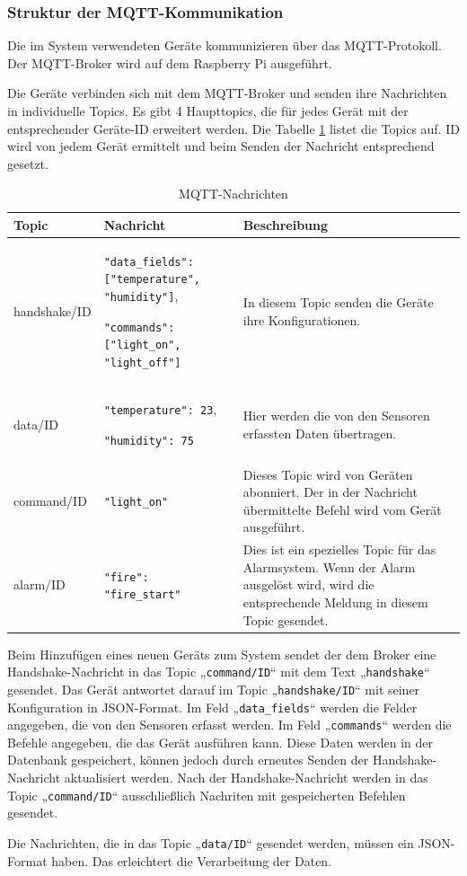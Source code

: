 \documentclass[12pt, letterpaper]{article}
\begin{document}
\subsubsection{Struktur der MQTT-Kommunikation}
\par Die im System verwendeten Geräte kommunizieren über das MQTT-Protokoll. Der MQTT-Broker wird auf dem Raspberry Pi ausgeführt. 
\par Die Geräte verbinden sich mit dem MQTT-Broker und senden ihre Nachrichten in individuelle Topics. Es gibt 4 Haupttopics, die für jedes Gerät mit der entsprechender Geräte-ID erweitert werden. Die Tabelle \ref{tab:mqttnachrichten} listet die Topics auf. ID wird von jedem Gerät ermittelt und beim Senden der Nachricht entsprechend gesetzt.
\begin{table}[h]
  \centering
  \begin{tabular}{|>{\centering\arraybackslash}m{}|>{\centering\arraybackslash}m{6cm}|>{\centering\arraybackslash}m{8cm}|}
    \hline
    \textbf{Topic}      & \textbf{Nachricht}                         & \textbf{Beschreibung} \\ \hline
    handshake/ID   &  \texttt{"data\_fields": ["temperature", "humidity"]},\par \texttt{"commands": ["light\_on", "light\_off"]}                                   &   In diesem Topic senden die Geräte ihre Konfigurationen.\\\hline
    data/ID     & \texttt{"temperature": 23}, \par \texttt{"humidity": 75} & Hier werden die von den Sensoren erfassten Daten übertragen. \\ \hline
    command/ID  & \texttt{"light\_on"}  & Dieses Topic wird von Geräten abonniert. Der in der Nachricht übermittelte Befehl wird vom Gerät ausgeführt. \\ \hline
    alarm/ID    & \texttt{"fire": "fire\_start"} & Dies ist ein spezielles Topic für das Alarmsystem. Wenn der Alarm ausgelöst wird, wird die entsprechende Meldung in diesem Topic gesendet. \\ \hline
  \end{tabular}
  \caption{MQTT-Nachrichten}
  \label{tab:mqttnachrichten}
\end{table} 
\par Beim Hinzufügen eines neuen Geräts zum System sendet der dem Broker eine Handshake-Nachricht in das Topic „\texttt{command/ID}“ mit dem Text „\texttt{handshake}“ gesendet. Das Gerät antwortet darauf im Topic „\texttt{handshake/ID}“ mit seiner Konfiguration in JSON-Format. Im Feld „\texttt{data\_fields}“ werden die Felder angegeben, die von den Sensoren erfasst werden. Im Feld „\texttt{commands}“ werden die Befehle angegeben, die das Gerät ausführen kann. Diese Daten werden in der Datenbank gespeichert, können jedoch durch erneutes Senden der Handshake-Nachricht aktualisiert werden. Nach der Handshake-Nachricht werden in das Topic „\texttt{command/ID}“ ausschließlich Nachriten mit gespeicherten Befehlen gesendet. 
\par Die Nachrichten, die in das Topic „\texttt{data/ID}“ gesendet werden, müssen ein JSON-Format haben. Das erleichtert die Verarbeitung der Daten. 
\newpage
\end{document}
